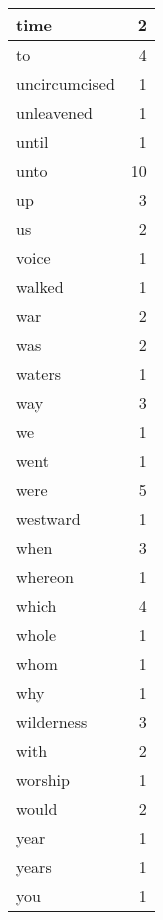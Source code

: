 \begin{center}
\begin{longtable}{l|r}
time & 2 \\ \hline
to & 4 \\ \hline
uncircumcised & 1 \\ \hline
unleavened & 1 \\ \hline
until & 1 \\ \hline
unto & 10 \\ \hline
up & 3 \\ \hline
us & 2 \\ \hline
voice & 1 \\ \hline
walked & 1 \\ \hline
war & 2 \\ \hline
was & 2 \\ \hline
waters & 1 \\ \hline
way & 3 \\ \hline
we & 1 \\ \hline
went & 1 \\ \hline
were & 5 \\ \hline
westward & 1 \\ \hline
when & 3 \\ \hline
whereon & 1 \\ \hline
which & 4 \\ \hline
whole & 1 \\ \hline
whom & 1 \\ \hline
why & 1 \\ \hline
wilderness & 3 \\ \hline
with & 2 \\ \hline
worship & 1 \\ \hline
would & 2 \\ \hline
year & 1 \\ \hline
years & 1 \\ \hline
you & 1 \\ \hline
\end{longtable}
\end{center}



\normalsize



